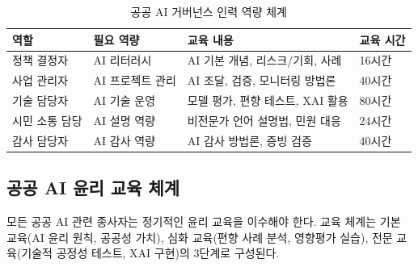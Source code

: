\begin{table}[htbp]
\centering
\caption{공공 AI 거버넌스 인력 역량 체계}
\label{tab:18_capacity}
\begin{tabularx}{\textwidth}{p{2.5cm}p{3cm}Xp{2.5cm}}
\toprule
\textbf{역할} & \textbf{필요 역량} & \textbf{교육 내용} & \textbf{교육 시간} \\
\midrule
정책 결정자 & AI 리터러시 & AI 기본 개념, 리스크/기회, 사례 & 16시간 \\
사업 관리자 & AI 프로젝트 관리 & AI 조달, 검증, 모니터링 방법론 & 40시간 \\
기술 담당자 & AI 기술 운영 & 모델 평가, 편향 테스트, XAI 활용 & 80시간 \\
시민 소통 담당 & AI 설명 역량 & 비전문가 언어 설명법, 민원 대응 & 24시간 \\
감사 담당자 & AI 감사 역량 & AI 감사 방법론, 증빙 검증 & 40시간 \\
\bottomrule
\end{tabularx}
\end{table}

\subsection{공공 AI 윤리 교육 체계}

모든 공공 AI 관련 종사자는 정기적인 윤리 교육을 이수해야 한다. 교육 체계는 기본 교육(AI 윤리 원칙, 공공성 가치), 심화 교육(편향 사례 분석, 영향평가 실습), 전문 교육(기술적 공정성 테스트, XAI 구현)의 3단계로 구성된다.

